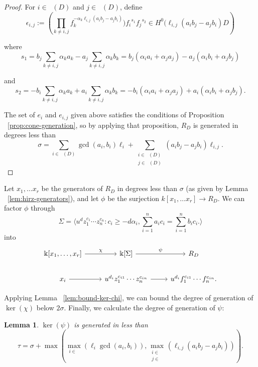 \documentclass{amsart}
\theoremstyle{plain}
\newtheorem{lem}[thm]{Lemma}
\theoremstyle{definition}
\theoremstyle{remark}
\numberwithin{equation}{section}
\newcommand\bk{{\Bbbk}}
\newcommand\bida{a}
\newcommand\bidb{b}
\DeclareMathOperator{\Te}{T_=}
\DeclareMathOperator{\Tp}{T_+}
\DeclareMathOperator{\Tm}{T_-}
\begin{document}
\begin{proof}
For $i \in \Tp(D)$ and $j \in \Tm(D)$, define
\[
	\epsilon_{i, j} := \left(\prod_{k \ne i, j} f_k^{-\alpha_k \ell_{i,j} (\bida_i \bidb_
	j - \bida_j \bidb_i)}) {f_i}^{s_1} {f_j}^{s_2} \in H^0(\ell_{i, j}
	(\bida_i \bidb_j - \bida_j \bidb_i) D \right)
\]

\noindent
where
\[
	s_1 = \bidb_j \sum_{k \ne i,j} \alpha_k \bida_k - \bida_j \sum_{k \ne i, j}
	\alpha_k \bidb_k = b_j (\alpha_i a_i + \alpha_j a_j) - a_j (\alpha_i b_i + \alpha_j b_j)
\]

\noindent
and
\[
	s_2 = -\bidb_i \sum_{k \ne i, j} \alpha_k \bida_k + \bida_i \sum_{k \ne i, j}
	\alpha_k \bidb_k = -b_i (\alpha_i a_i + \alpha_j a_j) + a_i (\alpha_i b_i + \alpha_j b_j).
\]

The set of $e_i$ and $e_{i,j}$ given above satisfies the conditions of Proposition ~\ref{prop:cone-generation}, so by applying that proposition, $R_D$ is generated in 
degrees less than
\[
	\sigma = \sum_{i\in \Te(D)} \gcd(\bida_i, \bidb_i)\ell_i + \sum_{\substack{
	i \in \Tp(D) \\	j \in \Tm(D)}} (\bida_i \bidb_j- \bida_j \bidb_i)\ell_{i,j}.
\]
\end{proof}

Let $x_1, \ldots x_r$ be the generators of $R_D$ in degrees less than $\sigma$ (as given by Lemma ~\ref{lem:hirz-generators}), and let $\phi$ be the surjection $k[x_1, \ldots x_r] \to R_D$.  We can factor $\phi$ through 
\[
	\Sigma =  \langle u^d z_1^{c_1} \cdots z_n^{c_n} : c_i \geq -d
	\alpha_i, \sum_{i=1}^{n} \bida_i c_i = \sum_{i=1}^{n} \bidb_i c_i.
	\rangle 
\]
into
\[
\begin{tikzcd}
	\bk[x_1,\ldots, x_r] \ar {r}{\chi} & \bk[\Sigma] \ar {r}{\psi} & R_D \\
	x_i \ar r & u^{d_i}z_1^{c_{i1}} \cdots z_n^{c_{in}} \ar r & u^{d_i}f_1^{c_{i1}} \cdots f_n^{c_{in}}.
\end{tikzcd}
\]

Applying Lemma ~\ref{lem:bound-ker-chi}, we can bound the degree of generation of $\ker(\chi)$ below
$2 \sigma$.
Finally, we calculate the degree of generation of $\psi$:

\begin{lem}
$\ker(\psi)$ is generated in less than
\[
	\tau = \sigma
	+ \max \left( \max_{i\in \Te}(\ell_i \gcd(a_i, b_i)), \max_{\substack{
	i \in	\Tp \\ j\in \Tm}} (\ell_{i,j} (\bida_i \bidb_j - \bida_j \bidb_i))
	\right).
\]
\end{lem}
\end{document}
